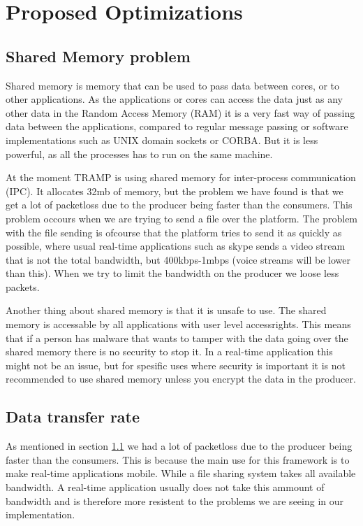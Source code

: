 \section{Proposed Optimizations}
\label{sec:optimizations}

\subsection{Shared Memory problem}
\label{smp}
Shared memory is memory that can be used to pass data between cores, or to other applications. As the applications or cores can access the data just as any other data in the Random Access Memory (RAM) it is a very fast way of passing data between the applications, compared to regular message passing or software implementations such as UNIX domain sockets or CORBA. But it is less powerful, as all the processes has to run on the same machine.\cite{shared_memory}

At the moment TRAMP is using shared memory for inter-process communication (IPC). It allocates 32mb of memory, but the problem we have found is that we get a lot of packetloss due to the producer being faster than the consumers. This problem occours when we are trying to send a file over the platform. The problem with the file sending is ofcourse that the platform tries to send it as quickly as possible, where usual real-time applications such as skype sends a video stream that is not the total bandwidth, but 400kbps-1mbps (voice streams will be lower than this). When we try to limit the bandwidth on the producer we loose less packets.

Another thing about shared memory is that it is unsafe to use. The shared memory is accessable by all applications with user level accessrights. This means that if a person has malware that wants to tamper with the data going over the shared memory there is no security to stop it. In a real-time application this might not be an issue, but for spesific uses where security is important it is not recommended to use shared memory unless you encrypt the data in the producer.

\subsection{Data transfer rate}
As mentioned in section \ref{smp} we had a lot of packetloss due to the producer being faster than the consumers. This is because the main use for this framework is to make real-time applications mobile. While a file sharing system takes all available bandwidth. A real-time application usually does not take this ammount of bandwidth and is therefore more resistent to the problems we are seeing in our implementation.

